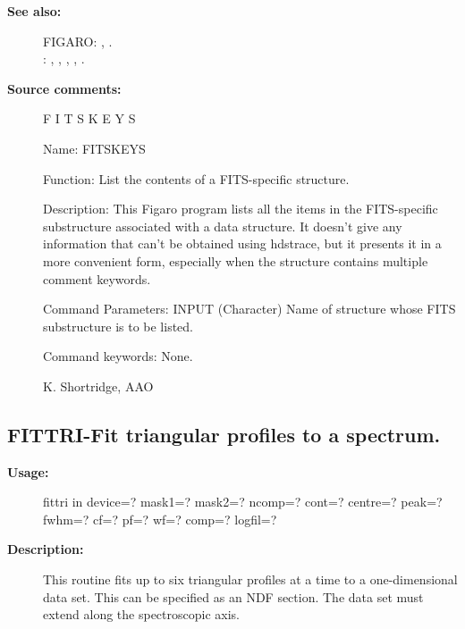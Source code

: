 \begin{description}
\begin{description}
\item [\textbf{See also:}]
FIGARO: , .\\
: , , , , .\\

\item [\textbf{Source comments:}]
\begin{terminalv}
 F I T S K E Y S

 Name: FITSKEYS

 Function:
    List the contents of a FITS-specific structure.

 Description:
    This Figaro program lists all the items in the FITS-specific
    substructure associated with a data structure.  It doesn't
    give any information that can't be obtained using hdstrace, but
    it presents it in a more convenient form, especially when the
    structure contains multiple comment keywords.

 Command Parameters:
    INPUT     (Character) Name of structure whose FITS substructure
              is to be listed.

 Command keywords: None.

 K. Shortridge, AAO
\end{terminalv}
\end{description}
\subsection{FITTRI-\label{FITTRI}Fit triangular profiles to a spectrum.}
\begin{description}

\item [\textbf{Usage:}]

   fittri in device=? mask1=? mask2=?
      ncomp=? cont=? centre=? peak=? fwhm=? cf=? pf=? wf=?
      comp=? logfil=?


\item [\textbf{Description:}]

   This routine fits up to six triangular profiles at a time to a
   one-dimensional data set. This can be specified as an NDF section.
   The data set must extend along the spectroscopic axis.



\end{description}
\end{description}
